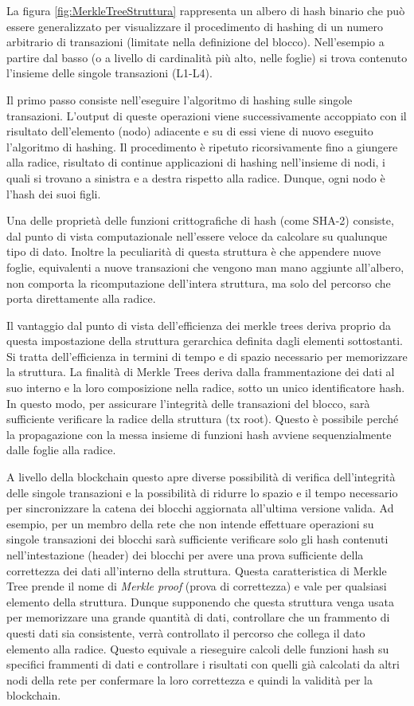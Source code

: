 La figura \ref{fig:MerkleTreeStruttura} rappresenta un albero di hash binario che può essere generalizzato per visualizzare il procedimento di hashing di un numero arbitrario di transazioni (limitate nella definizione del blocco). Nell'esempio a partire dal basso (o a livello di cardinalità più alto, nelle foglie) si trova contenuto l'insieme delle singole transazioni (L1-L4).

Il primo passo consiste nell’eseguire l'algoritmo di hashing sulle singole transazioni. L'output di queste operazioni viene successivamente accoppiato con il risultato dell'elemento (nodo) adiacente e su di essi viene di nuovo eseguito l'algoritmo di hashing. Il procedimento è ripetuto ricorsivamente fino a giungere alla radice, risultato di continue applicazioni di hashing nell'insieme di nodi, i quali si trovano a sinistra e a destra rispetto alla radice. Dunque, ogni nodo è l'hash dei suoi figli. 

Una delle proprietà delle funzioni crittografiche di hash (come SHA-2) consiste, dal punto di vista computazionale nell'essere veloce da calcolare su qualunque tipo di dato. Inoltre la peculiarità di questa struttura è che appendere nuove foglie, equivalenti a nuove transazioni che vengono man mano aggiunte all’albero, non comporta la ricomputazione dell’intera struttura, ma solo del percorso che porta direttamente alla radice.

Il vantaggio dal punto di vista dell'efficienza dei merkle trees deriva proprio da questa impostazione della struttura gerarchica definita dagli elementi sottostanti. Si tratta dell'efficienza in termini di tempo e di spazio necessario per memorizzare la struttura. La finalità di Merkle Trees deriva dalla frammentazione dei dati al suo interno e la loro composizione nella radice, sotto un unico identificatore hash. In questo modo, per assicurare l'integrità delle transazioni del blocco, sarà sufficiente verificare la radice della struttura (tx root). Questo è possibile perché la propagazione con la messa insieme di funzioni hash avviene sequenzialmente dalle foglie alla radice.

A livello della blockchain questo apre diverse possibilità di verifica dell'integrità delle singole transazioni e la possibilità di ridurre lo spazio e il tempo necessario per sincronizzare la catena dei blocchi aggiornata all'ultima versione valida. Ad esempio, per un membro della rete che non intende effettuare operazioni su singole transazioni dei blocchi sarà sufficiente verificare solo gli hash contenuti nell'intestazione (header) dei blocchi per avere una prova sufficiente della correttezza dei dati all'interno della struttura. Questa caratteristica di Merkle Tree prende il nome di \emph{Merkle proof} (prova di correttezza) e vale per qualsiasi elemento della struttura. Dunque supponendo che questa struttura venga usata per memorizzare una grande quantità di dati, controllare che un frammento di questi dati sia consistente, verrà controllato il percorso che collega il dato elemento alla radice. Questo equivale a rieseguire calcoli delle funzioni hash su specifici frammenti di dati e controllare i risultati con quelli già calcolati da altri nodi della rete per confermare la loro correttezza e quindi la validità per la blockchain.

